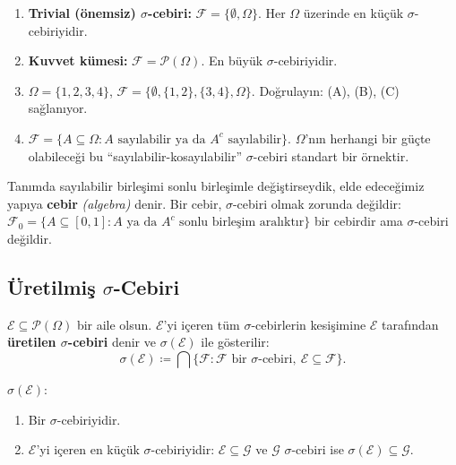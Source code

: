 \begin{ornek}\label{ex:sigmaoernekler}
\begin{enumerate}[label=(\alph*)]
  \item \textbf{Trivial (önemsiz) $\sigma$-cebiri:} $\mathcal{F} = \{\emptyset, \Omega\}$.
        Her $\Omega$ üzerinde en küçük $\sigma$-cebiriyidir.
  \item \textbf{Kuvvet kümesi:} $\mathcal{F} = \mathcal{P}(\Omega)$.
        En büyük $\sigma$-cebiriyidir.
  \item $\Omega = \{1,2,3,4\}$, $\mathcal{F} = \{\emptyset, \{1,2\}, \{3,4\}, \Omega\}$.
        Doğrulayın: (A), (B), (C) sağlanıyor.
  \item $\mathcal{F} = \{A \subseteq \Omega : A \text{ sayılabilir ya da } A^c \text{ sayılabilir}\}$.
        $\Omega$'nın herhangi bir güçte olabileceği bu ``sayılabilir-kosayılabilir''
        $\sigma$-cebiri standart bir örnektir.
\end{enumerate}
\end{ornek}

\begin{kritiksorgu}
Tanımda sayılabilir birleşimi sonlu birleşimle değiştirseydik, elde edeceğimiz
yapıya \textbf{cebir} \emph{(algebra)} denir. Bir cebir, $\sigma$-cebiri olmak
zorunda değildir: $\mathcal{F}_0 = \{A \subseteq [0,1] : A \text{ ya da } A^c
\text{ sonlu birleşim aralıktır}\}$ bir cebirdir ama $\sigma$-cebiri değildir.
\end{kritiksorgu}

\subsection{Üretilmiş $\sigma$-Cebiri}

\begin{tanim}\label{def:sigmauretilensi}
$\mathcal{E} \subseteq \mathcal{P}(\Omega)$ bir aile olsun.
$\mathcal{E}$'yi içeren tüm $\sigma$-cebirlerin kesişimine
$\mathcal{E}$ tarafından \textbf{üretilen $\sigma$-cebiri} denir ve
$\sigma(\mathcal{E})$ ile gösterilir:
\[
  \sigma(\mathcal{E}) \coloneqq \bigcap \{\mathcal{F} : \mathcal{F} \text{ bir } \sigma\text{-cebiri}, \ \mathcal{E} \subseteq \mathcal{F}\}.
\]
\end{tanim}

\begin{onerme}\label{prop:sigmaiyitanim}
$\sigma(\mathcal{E})$:
\begin{enumerate}[label=(\roman*)]
  \item Bir $\sigma$-cebiriyidir.
  \item $\mathcal{E}$'yi içeren en küçük $\sigma$-cebiriyidir:
        $\mathcal{E} \subseteq \mathcal{G}$ ve $\mathcal{G}$ $\sigma$-cebiri ise
        $\sigma(\mathcal{E}) \subseteq \mathcal{G}$.
\end{enumerate}
\end{onerme}

